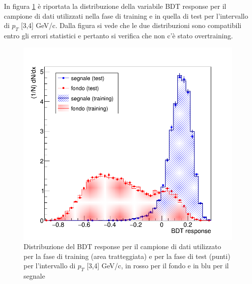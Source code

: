     In figura \ref{fig:testing_3_4} è riportata la distribuzione della variabile BDT response per il campione di dati utilizzati nella fase di training e in quella di test per l'intervallo di $p_T$ [3,4] GeV/c. Dalla figura si vede che le due distribuzioni sono compatibili entro gli errori statistici e pertanto si verifica che non c'è stato overtraining.
    
    
    \begin{figure}[htbp] 
        \centering
        \includegraphics[width=0.7\linewidth]{training&testing/distribuzione_test_train.png}
        \caption{Distribuzione del BDT response per il campione di dati utilizzato per la fase di training (area tratteggiata) e per la fase di test (punti) per l'intervallo di $p_T$ [3,4] GeV/c, in rosso per il fondo e in blu per il segnale}
        \label{fig:testing_3_4}
    \end{figure}
 
 
 
